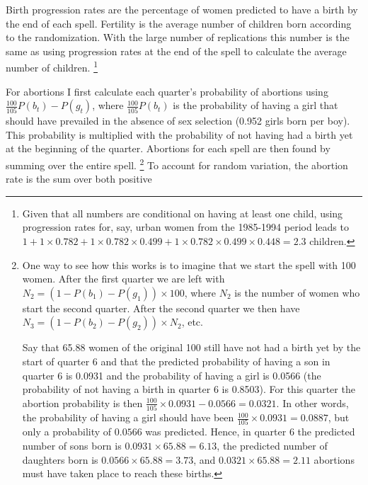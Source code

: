 \documentclass[12pt,letterpaper]{article}
\begin{document}
Birth progression rates are the percentage of women predicted to have a birth 
by the end of each spell.
Fertility is the average number of children born according to the randomization.
With the large number of replications this number is the same as using progression
rates at the end of the spell to calculate the average number of children.%
\footnote{
Given that all numbers are conditional on having at least one child, using progression
rates for, say, urban women from the 1985-1994 period leads to 
$1+1\times0.782+1\times0.782\times0.499+1\times0.782\times0.499\times0.448=2.3 $  
children.
}

For abortions I first calculate each quarter's probability of abortions using
$\frac{100}{105}P(b_t)-P(g_t)$,
where $\frac{100}{105}P(b_t)$ is the probability of having a girl that should have 
prevailed in the absence of sex selection (0.952 girls born per boy).
This probability is multiplied with the probability of not having had a birth yet at 
the beginning of the quarter.
Abortions for each spell are then found by summing over the entire spell.%
\footnote{
One way to see how this works is to imagine that we start the spell with 100 women.
After the first quarter we are left with $N_2 = (1-P(b_1)-P(g_1)) \times 100$, where
$N_2$ is the number of women who start the second quarter. 
After the second quarter we then have $N_3 = (1-P(b_2)-P(g_2)) \times N_2$, etc.

Say that 65.88 women of the original 100 still have not had a birth yet by the start
of quarter 6 and that the predicted probability of having a son in quarter 6 is 0.0931 and 
the probability of having a girl is 0.0566 (the probability of not having a birth in 
quarter 6 is 0.8503).
For this quarter the abortion probability is then 
$\frac{100}{105}\times 0.0931 - 0.0566 = 0.0321$.
In other words, the probability of having a girl should have been 
$\frac{100}{105}\times 0.0931 = 0.0887$, but only a probability of $0.0566$ was 
predicted.
Hence, in quarter 6 the predicted number of sons born is $ 0.0931 \times 65.88 = 6.13$, 
the predicted number of daughters born is $ 0.0566 \times 65.88 = 3.73$, and 
$0.0321 \times 65.88 = 2.11$ abortions must have taken place to reach these births.
}
To account for random variation, the abortion rate is the sum over both positive 
\end{document}
